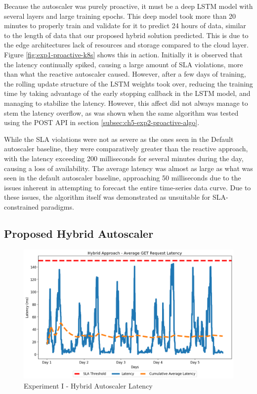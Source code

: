 Because the autoscaler was purely proactive, it must be a deep LSTM model with several layers and large training epochs. This deep model took more than 20 minutes to properly train and validate for it to predict 24 hours of data, similar to the length of data that our proposed hybrid solution predicted. This is due to the edge architectures lack of resources and storage compared to the cloud layer. Figure \ref{fig:exp1-proactive-k8s} shows this in action. Initially it is observed that the latency continually spiked, causing a large amount of SLA violations, more than what the reactive autoscaler caused. However, after a few days of training, the rolling update structure of the LSTM weights took over, reducing the training time by taking advantage of the early stopping callback in the LSTM model, and managing to stabilize the latency. However, this affect did not always manage to stem the latency overflow, as was shown when the same algorithm was tested using the POST API in section \ref{subsec:ch5-exp2-proactive-algo}.

While the SLA violations were not as severe as the ones seen in the Default autoscaler baseline, they were comparatively greater than the reactive approach, with the latency exceeding 200 milliseconds for several minutes during the day, causing a loss of availability. The average latency was almost as large as what was seen in the default autoscaler baseline, approaching 50 milliseconds due to the issues inherent in attempting to forecast the entire time-series data curve.  Due to these issues, the algorithm itself was demonstrated as unsuitable for SLA-constrained paradigms.\par

\subsection {Proposed Hybrid Autoscaler}
\label{subsec:ch5-exp1-hybrid-algo}

\begin{figure}[htb]
    \centering
    \caption{Experiment I - Hybrid Autoscaler Latency}
    \label{fig:exp1-hybrid-k8s}
    \includegraphics[width=0.6\linewidth]{Figures/Home-Timeline-Hybrid-Latency.png}
\end{figure}

